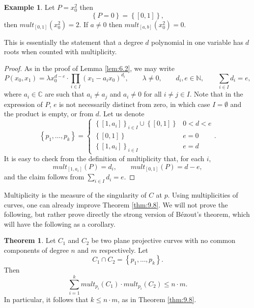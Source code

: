 \documentclass{article}
\newcommand{\N}{\mathbb{N}}
\newcommand{\C}{\mathbb{C}}
\newcommand{\rb}[1]{\left( #1 \right)}
\renewcommand{\sb}[1]{\left[ #1 \right]}
\newcommand{\cb}[1]{\left\{ #1 \right\}}
\theoremstyle{definition}\newtheorem{definition}{Definition}[section]
\theoremstyle{definition}\newtheorem{notation}[definition]{Notation}
\theoremstyle{definition}\newtheorem{remark}[definition]{Remark}
\theoremstyle{definition}\newtheorem{example1}[definition]{Example}
\theoremstyle{definition}\newtheorem{fact}{Fact}
\theoremstyle{definition}\newtheorem{exercise}{Exercise}
\theoremstyle{definition}\newtheorem*{example2}{Example}
\newtheorem{theorem}[definition]{Theorem}
\begin{document}
\begin{example2}
Let $ P = x_0^2 $ then
$$ \cb{P = 0} = \cb{\sb{0, 1}}, $$
then $ mult_{\sb{0, 1}}\rb{x_0^2} = 2 $. If $ a \ne 0 $ then $ mult_{\sb{a, b}}\rb{x_0^2} = 0 $.
\end{example2}

This is essentially the statement that a degree $ d $ polynomial in one variable has $ d $ roots when counted with multiplicity.

\begin{proof}
As in the proof of Lemma \ref{lem:6.2}, we may write
$$ P\rb{x_0, x_1} = \lambda x_0^{d - e} \cdot \prod_{i \in I} \rb{x_1 - a_ix_0}^{d_i}, \qquad \lambda \ne 0, \qquad d_i, e \in \N, \qquad \sum_{i \in I} d_i = e, $$
where $ a_i \in \C $ are such that $ a_i \ne a_j $ and $ a_i \ne 0 $ for all $ i \ne j \in I $. Note that in the expression of $ P $, $ e $ is not necessarily distinct from zero, in which case $ I = \emptyset $ and the product is empty, or from $ d $. Let us denote
$$ \cb{p_1, \dots, p_k} = \begin{cases}
\cb{\sb{1, a_i}}_{i \in I} \cup \cb{\sb{0, 1}} & 0 < d < e \\
\cb{\sb{0, 1}} & e = 0 \\
\cb{\sb{1, a_i}}_{i \in I} & e = d
\end{cases}. $$
It is easy to check from the definition of multiplicity that, for each $ i $,
$$ mult_{\sb{1, a_i}}\rb{P} = d_i, \qquad mult_{\sb{0, 1}}\rb{P} = d - e, $$
and the claim follows from $ \sum_{i \in I} d_i = e $.
\end{proof}


Multiplicity is the measure of the singularity of $ C $ at $ p $. Using multiplicities of curves, one can already improve Theorem \ref{thm:9.8}. We will not prove the following, but rather prove directly the strong version of B\'ezout's theorem, which will have the following as a corollary.

\begin{theorem}
\label{thm:11.6}
Let $ C_1 $ and $ C_2 $ be two plane projective curves with no common components of degree $ n $ and $ m $ respectively. Let
$$ C_1 \cap C_2 = \cb{p_1, \dots, p_k}. $$
Then
$$ \sum_{i = 1}^k mult_{p_i}\rb{C_1} \cdot mult_{p_i}\rb{C_2} \le n \cdot m. $$
In particular, it follows that $ k \le n \cdot m $, as in Theorem \ref{thm:9.8}.
\end{theorem}
\end{document}
